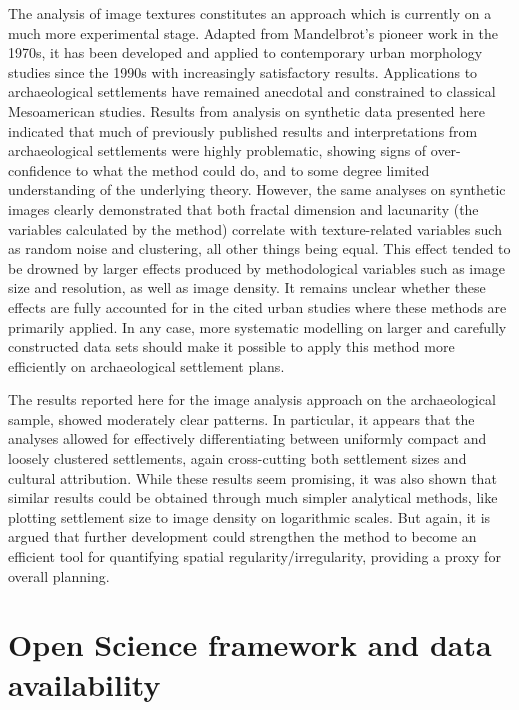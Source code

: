 \documentclass[
  12pt,
  a4paper, twoside]{book}
\begin{document}
The analysis of image textures constitutes an approach which is currently on a much more experimental stage. Adapted from Mandelbrot's pioneer work in the 1970s, it has been developed and applied to contemporary urban morphology studies since the 1990s with increasingly satisfactory results. Applications to archaeological settlements have remained anecdotal and constrained to classical Mesoamerican studies. Results from analysis on synthetic data presented here indicated that much of previously published results and interpretations from archaeological settlements were highly problematic, showing signs of over-confidence to what the method could do, and to some degree limited understanding of the underlying theory. However, the same analyses on synthetic images clearly demonstrated that both fractal dimension and lacunarity (the variables calculated by the method) correlate with texture-related variables such as random noise and clustering, all other things being equal. This effect tended to be drowned by larger effects produced by methodological variables such as image size and resolution, as well as image density. It remains unclear whether these effects are fully accounted for in the cited urban studies where these methods are primarily applied. In any case, more systematic modelling on larger and carefully constructed data sets should make it possible to apply this method more efficiently on archaeological settlement plans.

The results reported here for the image analysis approach on the archaeological sample, showed moderately clear patterns. In particular, it appears that the analyses allowed for effectively differentiating between uniformly compact and loosely clustered settlements, again cross-cutting both settlement sizes and cultural attribution. While these results seem promising, it was also shown that similar results could be obtained through much simpler analytical methods, like plotting settlement size to image density on logarithmic scales. But again, it is argued that further development could strengthen the method to become an efficient tool for quantifying spatial regularity/irregularity, providing a proxy for overall planning.

\hypertarget{open-science-framework-and-data-availability}{%
\section{Open Science framework and data availability}\label{open-science-framework-and-data-availability}}
\end{document}
